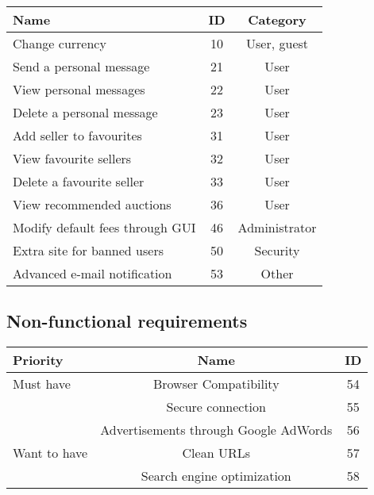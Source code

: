 	\begin{tabular}{l|c c}
	  Name & ID & Category \\ 
	  \hline
	  Change currency & 10 & User, guest \\
	  Send a personal message & 21 & User \\
	  View personal messages & 22 & User \\
	  Delete a personal message & 23 & User \\
	  Add seller to favourites  & 31 & User \\
	  View favourite sellers & 32 & User \\
	  Delete a favourite seller & 33 & User \\
	  View recommended auctions & 36 & User \\
	  Modify default fees through GUI & 46 & Administrator \\
	  Extra site for banned users & 50 & Security \\
	  Advanced e-mail notification & 53 & Other
	\end{tabular}
	
	\subsection{Non-functional requirements}
	
	\begin{tabular}{l|c c}
	  Priority & Name & ID \\ 
	  \hline
	  Must have & Browser Compatibility & 54 \\
	  & Secure connection & 55 \\
	  & Advertisements through Google AdWords & 56 \\
	  \hline
	  Want to have & Clean URLs & 57 \\
	  & Search engine optimization & 58
	\end{tabular}
	
	  
	